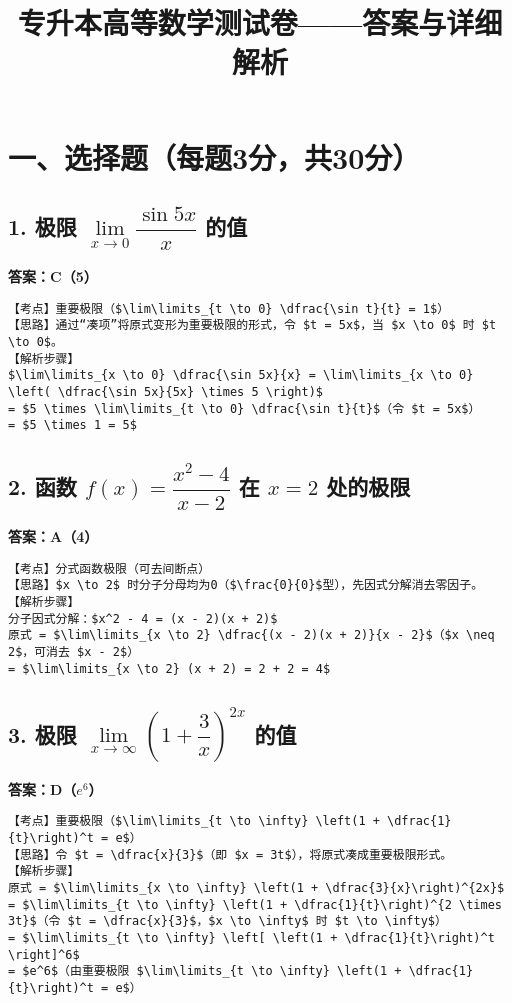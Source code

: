 \documentclass{exam-zh}
\begin{document}
\title{专升本高等数学测试卷——答案与详细解析}
\maketitle


\section*{一、选择题（每题3分，共30分）}

\subsection*{1. 极限 $\lim\limits_{x \to 0} \dfrac{\sin 5x}{x}$ 的值}
\noindent \textbf{答案：C（5）}
\begin{verbatim}
【考点】重要极限（$\lim\limits_{t \to 0} \dfrac{\sin t}{t} = 1$）
【思路】通过“凑项”将原式变形为重要极限的形式，令 $t = 5x$，当 $x \to 0$ 时 $t \to 0$。
【解析步骤】
$\lim\limits_{x \to 0} \dfrac{\sin 5x}{x} = \lim\limits_{x \to 0} \left( \dfrac{\sin 5x}{5x} \times 5 \right)$
= $5 \times \lim\limits_{t \to 0} \dfrac{\sin t}{t}$（令 $t = 5x$）
= $5 \times 1 = 5$
\end{verbatim}

\subsection*{2. 函数 $f(x) = \dfrac{x^2 - 4}{x - 2}$ 在 $x = 2$ 处的极限}
\noindent \textbf{答案：A（4）}
\begin{verbatim}
【考点】分式函数极限（可去间断点）
【思路】$x \to 2$ 时分子分母均为0（$\frac{0}{0}$型），先因式分解消去零因子。
【解析步骤】
分子因式分解：$x^2 - 4 = (x - 2)(x + 2)$
原式 = $\lim\limits_{x \to 2} \dfrac{(x - 2)(x + 2)}{x - 2}$（$x \neq 2$，可消去 $x - 2$）
= $\lim\limits_{x \to 2} (x + 2) = 2 + 2 = 4$
\end{verbatim}

\subsection*{3. 极限 $\lim\limits_{x \to \infty} \left(1 + \dfrac{3}{x}\right)^{2x}$ 的值}
\noindent \textbf{答案：D（$e^6$）}
\begin{verbatim}
【考点】重要极限（$\lim\limits_{t \to \infty} \left(1 + \dfrac{1}{t}\right)^t = e$）
【思路】令 $t = \dfrac{x}{3}$（即 $x = 3t$），将原式凑成重要极限形式。
【解析步骤】
原式 = $\lim\limits_{x \to \infty} \left(1 + \dfrac{3}{x}\right)^{2x}$
= $\lim\limits_{t \to \infty} \left(1 + \dfrac{1}{t}\right)^{2 \times 3t}$（令 $t = \dfrac{x}{3}$，$x \to \infty$ 时 $t \to \infty$）
= $\lim\limits_{t \to \infty} \left[ \left(1 + \dfrac{1}{t}\right)^t \right]^6$
= $e^6$（由重要极限 $\lim\limits_{t \to \infty} \left(1 + \dfrac{1}{t}\right)^t = e$）
\end{verbatim}
\end{document}

